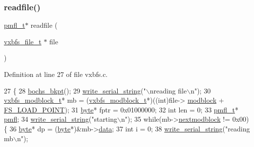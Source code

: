 \subsubsection{\texorpdfstring{readfile()}{readfile()}}
{\footnotesize\ttfamily \hyperlink{a00185_a02f7eedc7de6c770b6b29a62905fc61d_a02f7eedc7de6c770b6b29a62905fc61d}{pmfl\+\_\+t}$\ast$ readfile (\begin{DoxyParamCaption}\item[{\hyperlink{a00200_abb93e2407af0d8fe0f5629ce6456c6f9_abb93e2407af0d8fe0f5629ce6456c6f9}{vxbfs\+\_\+file\+\_\+t} $\ast$}]{file }\end{DoxyParamCaption})}



Definition at line 27 of file vxbfs.\+c.


\begin{DoxyCode}
27                                      \{
28     \hyperlink{a00158_a3f7e7be8f62f43b2b62df54cac1590be_a3f7e7be8f62f43b2b62df54cac1590be}{bochs\_bkpt}();
29     \hyperlink{a00050_aabbe45d6670f606c53ba38a5fb14b650_aabbe45d6670f606c53ba38a5fb14b650}{write\_serial\_string}(\textcolor{stringliteral}{"\(\backslash\)nreading file\(\backslash\)n"});
30     \hyperlink{a00326}{vxbfs\_modblock\_t}* mb = (\hyperlink{a00326}{vxbfs\_modblock\_t}*)((\textcolor{keywordtype}{int})file->
      \hyperlink{a00330_a56503c715b4121591ca7367c9cbd7093_a56503c715b4121591ca7367c9cbd7093}{modblock} + \hyperlink{a00128_ade5f4f9306a7cacc0cb2a518bd97e237_ade5f4f9306a7cacc0cb2a518bd97e237}{FS\_LOAD\_POINT});
31     \hyperlink{a00134_ab8ef12fab634c171394422d0ee8baf94_ab8ef12fab634c171394422d0ee8baf94}{byte}* fptr = 0x01000000;
32     \textcolor{keywordtype}{int} len = 0;
33     \hyperlink{a00310}{pmfl\_t}* \hyperlink{a00310}{pmfl};
34     \hyperlink{a00050_aabbe45d6670f606c53ba38a5fb14b650_aabbe45d6670f606c53ba38a5fb14b650}{write\_serial\_string}(\textcolor{stringliteral}{"starting\(\backslash\)n"});
35     \textcolor{keywordflow}{while}(mb->\hyperlink{a00326_afbf261c73a36b4d33e8a8b5179d4385b_afbf261c73a36b4d33e8a8b5179d4385b}{nextmodblock} != 0x00) \{
36         \hyperlink{a00134_ab8ef12fab634c171394422d0ee8baf94_ab8ef12fab634c171394422d0ee8baf94}{byte}* dp = (\hyperlink{a00134_ab8ef12fab634c171394422d0ee8baf94_ab8ef12fab634c171394422d0ee8baf94}{byte}*)&mb->\hyperlink{a00326_a327348a3ea3a02cfde4cdb1ccdcf2073_a327348a3ea3a02cfde4cdb1ccdcf2073}{data};
37         \textcolor{keywordtype}{int} i = 0;
38         \hyperlink{a00050_aabbe45d6670f606c53ba38a5fb14b650_aabbe45d6670f606c53ba38a5fb14b650}{write\_serial\_string}(\textcolor{stringliteral}{"reading mb\(\backslash\)n"});

\end{DoxyCode}
